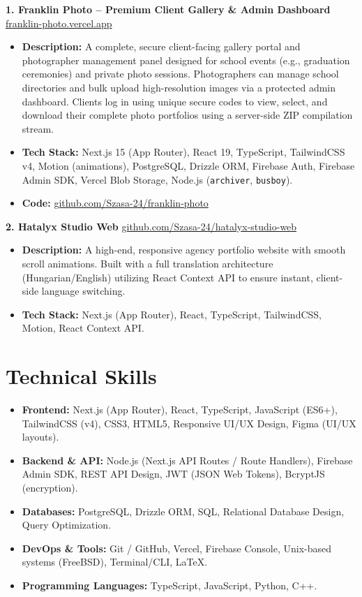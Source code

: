 \documentclass[10pt,a4paper]{article}
\begin{document}
\textbf{1. Franklin Photo -- Premium Client Gallery \& Admin Dashboard} \hfill \href{https://franklin-photo.vercel.app/}{franklin-photo.vercel.app}
\begin{itemize}
    \item \textbf{Description:} A complete, secure client-facing gallery portal and photographer management panel designed for school events (e.g., graduation ceremonies) and private photo sessions. Photographers can manage school directories and bulk upload high-resolution images via a protected admin dashboard. Clients log in using unique secure codes to view, select, and download their complete photo portfolios using a server-side ZIP compilation stream.
    \item \textbf{Tech Stack:} Next.js 15 (App Router), React 19, TypeScript, TailwindCSS v4, Motion (animations), PostgreSQL, Drizzle ORM, Firebase Auth, Firebase Admin SDK, Vercel Blob Storage, Node.js (\texttt{archiver}, \texttt{busboy}).
    \item \textbf{Code:} \href{https://github.com/Szasa-24/franklin-photo}{github.com/Szasa-24/franklin-photo}
\end{itemize}

\vspace{6pt}

\textbf{2. Hatalyx Studio Web} \hfill \href{https://github.com/Szasa-24/hatalyx-studio-web}{github.com/Szasa-24/hatalyx-studio-web}
\begin{itemize}
    \item \textbf{Description:} A high-end, responsive agency portfolio website with smooth scroll animations. Built with a full translation architecture (Hungarian/English) utilizing React Context API to ensure instant, client-side language switching.
    \item \textbf{Tech Stack:} Next.js (App Router), React, TypeScript, TailwindCSS, Motion, React Context API.
\end{itemize}

\section{Technical Skills}
\begin{itemize}
    \item \textbf{Frontend:} Next.js (App Router), React, TypeScript, JavaScript (ES6+), TailwindCSS (v4), CSS3, HTML5, Responsive UI/UX Design, Figma (UI/UX layouts).
    \item \textbf{Backend \& API:} Node.js (Next.js API Routes / Route Handlers), Firebase Admin SDK, REST API Design, JWT (JSON Web Tokens), BcryptJS (encryption).
    \item \textbf{Databases:} PostgreSQL, Drizzle ORM, SQL, Relational Database Design, Query Optimization.
    \item \textbf{DevOps \& Tools:} Git / GitHub, Vercel, Firebase Console, Unix-based systems (FreeBSD), Terminal/CLI, LaTeX.
    \item \textbf{Programming Languages:} TypeScript, JavaScript, Python, C++.
\end{itemize}
\end{document}
